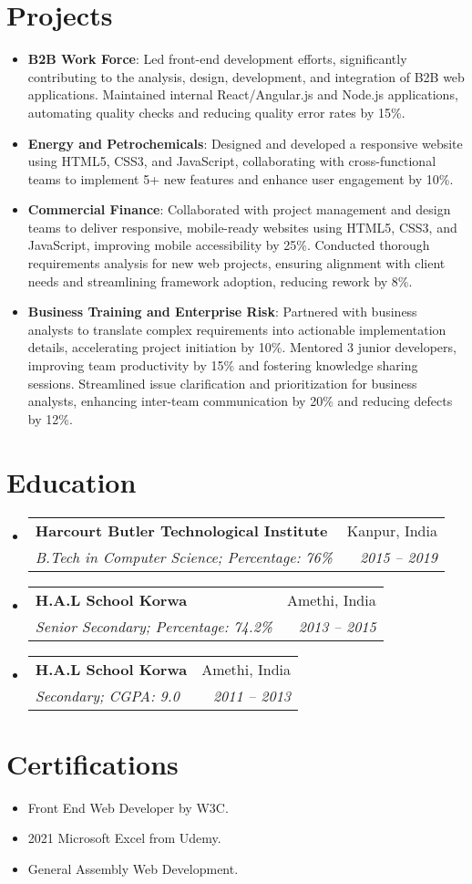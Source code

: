 \documentclass[letterpaper,11pt]{article}
\makeatletter
\newcommand{\resumeItem}[2]{
  \item\small{
    \textbf{#1}{: #2 \vspace{-2pt}}
  }
}
\newcommand{\resumeSubheading}[4]{
  \vspace{-1pt}\item
    \begin{tabular*}{0.97\textwidth}[t]{l@{\extracolsep{\fill}}r}
      \textbf{#1} & #2 \\
      \textit{\small#3} & \textit{\small #4} \\
    \end{tabular*}\vspace{-5pt}
}
\newcommand{\resumeSubItem}[2]{\resumeItem{#1}{#2}\vspace{-4pt}}
\newcommand{\resumeSubHeadingListStart}{\begin{itemize}[leftmargin=*]}
\newcommand{\resumeSubHeadingListEnd}{\end{itemize}}
\newcommand{\resumeItemListStart}{\begin{itemize}}
\newcommand{\resumeItemListEnd}{\end{itemize}\vspace{-5pt}}
\makeatother
\begin{document}
\section{Projects}
  \resumeSubHeadingListStart
    \resumeSubItem{B2B Work Force}
      {\small Led front-end development efforts, significantly contributing to the analysis, design, development, and integration of B2B web applications. Maintained internal React/Angular.js and Node.js applications, automating quality checks and reducing quality error rates by 15\%.}
    \resumeSubItem{Energy and Petrochemicals}
      {\small Designed and developed a responsive website using HTML5, CSS3, and JavaScript, collaborating with cross-functional teams to implement 5+ new features and enhance user engagement by 10\%.}
    \resumeSubItem{Commercial Finance}
      {\small Collaborated with project management and design teams to deliver responsive, mobile-ready websites using HTML5, CSS3, and JavaScript, improving mobile accessibility by 25\%. Conducted thorough requirements analysis for new web projects, ensuring alignment with client needs and streamlining framework adoption, reducing rework by 8\%.}
    \resumeSubItem{Business Training and Enterprise Risk}
      {\small Partnered with business analysts to translate complex requirements into actionable implementation details, accelerating project initiation by 10\%. Mentored 3 junior developers, improving team productivity by 15\% and fostering knowledge sharing sessions. Streamlined issue clarification and prioritization for business analysts, enhancing inter-team communication by 20\% and reducing defects by 12\%.}
  \resumeSubHeadingListEnd

\section{Education}
  \resumeSubHeadingListStart
    \resumeSubheading
      {Harcourt Butler Technological Institute}{Kanpur, India}
      {B.Tech in Computer Science; Percentage: 76\%}{2015 -- 2019}
    \resumeSubheading
      {H.A.L School Korwa}{Amethi, India}
      {Senior Secondary; Percentage: 74.2\%}{2013 -- 2015}
    \resumeSubheading
      {H.A.L School Korwa}{Amethi, India}
      {Secondary; CGPA: 9.0}{2011 -- 2013}
  \resumeSubHeadingListEnd

\section{Certifications}
  \resumeItemListStart
    \item \small{Front End Web Developer by W3C.}
    \item \small{2021 Microsoft Excel from Udemy.}
    \item \small{General Assembly Web Development.}
  \resumeItemListEnd
\end{document}
